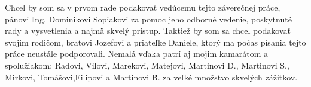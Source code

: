 Chcel by som sa v prvom rade poďakovať vedúcemu tejto záverečnej práce,
pánovi Ing. Dominikovi Sopiakovi za pomoc jeho odborné vedenie, poskytnuté rady a vysvetlenia a najmä skvelý prístup.
Taktiež by som sa chcel poďakovať svojim rodičom, bratovi Jozefovi a priateľke Daniele, ktorý ma počas písania tejto práce neustále podporovali.
Nemalá vďaka patrí aj mojim kamarátom a spolužiakom: Radovi, Vilovi, Marekovi, Matejovi, Martinovi D., Martinovi S., Mirkovi, Tomášovi,Filipovi a Martinovi B. za veľké množstvo skvelých zážitkov.
